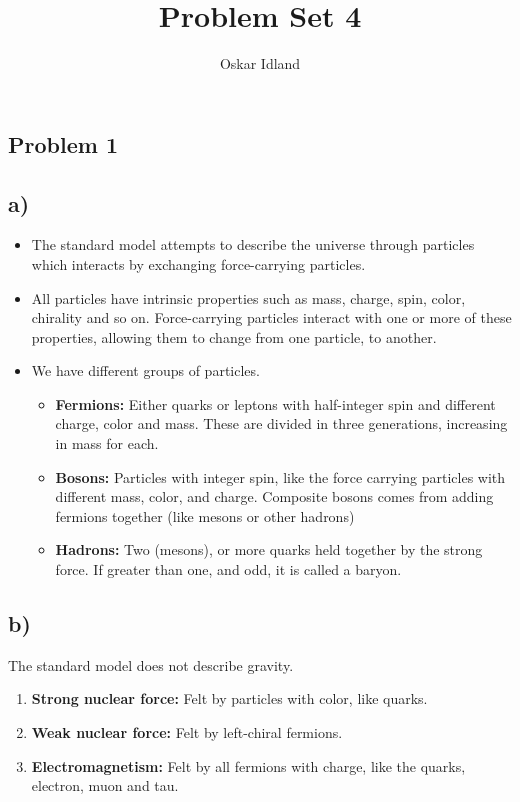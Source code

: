 \documentclass{article}
\author{Oskar Idland}
\title{Problem Set 4}
\date{}
\begin{document}
\maketitle
\newpage

\subsection*{Problem 1}
\subsection*{a)}
\begin{itemize}
    \item The standard model attempts to describe the universe through particles which interacts by exchanging force-carrying particles.
    \item All particles have intrinsic properties such as mass, charge, spin, color, chirality and so on. Force-carrying particles interact with one or more of these properties, allowing them to change from one particle, to another. 
    \item We have different groups of particles. 
    \begin{itemize}
        \item \textbf{Fermions:} Either quarks or leptons with half-integer spin and different charge, color and mass. These are divided in three generations, increasing in mass for each. 
        \item \textbf{Bosons:} Particles with integer spin, like the force carrying particles with different mass, color, and charge. Composite bosons comes from adding fermions together (like mesons or other hadrons)
        \item \textbf{Hadrons:} Two (mesons), or more quarks held together by the strong force. If greater than one, and odd, it is called a baryon. 
    \end{itemize}
\end{itemize}

\subsection*{b)}
The standard model does not describe gravity. 
\begin{enumerate}
    \item \textbf{Strong nuclear force:} Felt by particles with color, like quarks. 
    \item \textbf{Weak nuclear force:} Felt by left-chiral fermions. 
    \item \textbf{Electromagnetism:} Felt by all fermions with charge, like the quarks, electron, muon and tau. 
\end{enumerate}
\end{document}
